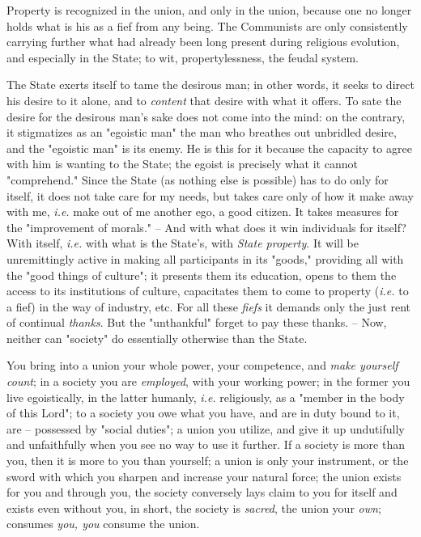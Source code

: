 \documentclass[a4paper]{book}
\begin{document}
Property is recognized in the union, and only in the union, because one no 
longer holds what is his as a fief from any being. The Communists are only 
consistently carrying further what had already been long present during 
religious evolution, and especially in the State; to wit, propertylessness, 
the feudal system.

The State exerts itself to tame the desirous man; in other words, it seeks to 
direct his desire to it alone, and to \textit{content} that desire with what 
it offers. To sate the desire for the desirous man's sake does not come into 
the mind: on the contrary, it stigmatizes as an "{}egoistic man"{} the man who 
breathes out unbridled desire, and the "{}egoistic man"{} is its enemy. He is 
this for it because the capacity to agree with him is wanting to the State; 
the egoist is precisely what it cannot "{}comprehend."{} Since the State (as 
nothing else is possible) has to do only for itself, it does not take care for 
my needs, but takes care only of how it make away with me, \textit{i.e.} make 
out of me another ego, a good citizen. It takes measures for the 
"{}improvement of morals."{} -- And with what does it win individuals for 
itself? With itself, \textit{i.e.} with what is the State's, with 
\textit{State property}. It will be unremittingly active in making all 
participants in its "{}goods,"{} providing all with the "{}good things of 
culture"{}; it presents them its education, opens to them the access to its 
institutions of culture, capacitates them to come to property (\textit{i.e.} 
to a fief) in the way of industry, etc. For all these \textit{fiefs} it 
demands only the just rent of continual \textit{thanks}. But the 
"{}unthankful"{} forget to pay these thanks. -- Now, neither can "{}society"{} 
do essentially otherwise than the State.

You bring into a union your whole power, your competence, and \textit{make 
yourself count}; in a society you are \textit{employed}, with your working 
power; in the former you live egoistically, in the latter humanly, 
\textit{i.e.} religiously, as a "{}member in the body of this Lord"{}; to a 
society you owe what you have, and are in duty bound to it, are -- possessed 
by "{}social duties"{}; a union you utilize, and give it up undutifully and 
unfaithfully when you see no way to use it further. If a society is more than 
you, then it is more to you than yourself; a union is only your instrument, or 
the sword with which you sharpen and increase your natural force; the union 
exists for you and through you, the society conversely lays claim to you for 
itself and exists even without you, in short, the society is \textit{sacred}, 
the union your \textit{own}; consumes \textit{you, you} consume the union.
\end{document}

